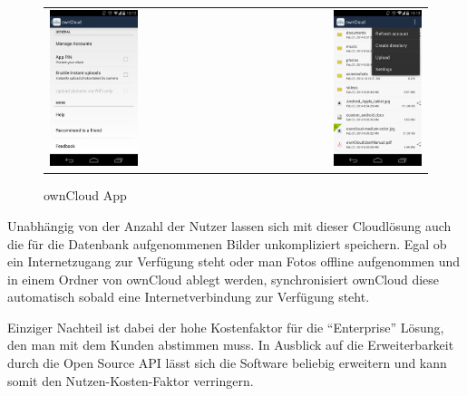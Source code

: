 \begin{figure}[htb]
	\begin{tabular}{l r}
		\includegraphics[width=0.49\textwidth]{Bilder/ownCloud-mobile1}
		&
		\includegraphics[width=0.49\textwidth]{Bilder/ownCloud-mobile2}
	\end{tabular}
	\caption{ownCloud App}
	\label{ownCloudApp}
\end{figure}

\hspace{2 cm}

Unabhängig von der Anzahl der Nutzer lassen sich mit dieser Cloudlösung auch die für die Datenbank aufgenommenen Bilder unkompliziert speichern. Egal ob ein Internetzugang zur Verfügung steht oder man Fotos offline aufgenommen und in einem Ordner von ownCloud ablegt werden, synchronisiert ownCloud diese automatisch sobald eine Internetverbindung zur Verfügung steht.

Einziger Nachteil ist dabei der hohe Kostenfaktor für die ``Enterprise'' Lösung, den man mit dem Kunden abstimmen muss. In Ausblick auf die Erweiterbarkeit durch die Open Source \ac{API} lässt sich die Software beliebig erweitern und kann somit den Nutzen-Kosten-Faktor verringern.
